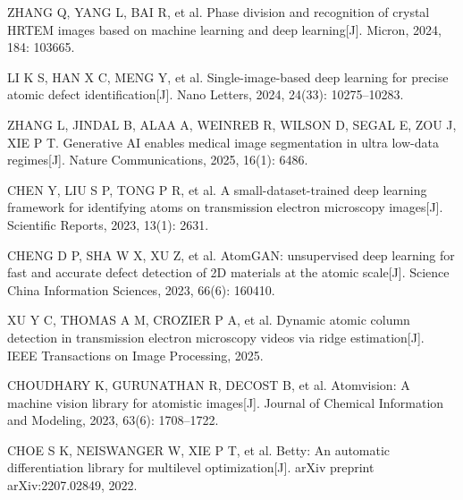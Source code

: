ZHANG Q, YANG L, BAI R, et al. Phase division and recognition of crystal HRTEM images based on machine learning and deep learning[J]. Micron, 2024, 184: 103665.

LI K S, HAN X C, MENG Y, et al. Single-image-based deep learning for precise atomic defect identification[J]. Nano Letters, 2024, 24(33): 10275--10283.

ZHANG L, JINDAL B, ALAA A, WEINREB R, WILSON D, SEGAL E, ZOU J, XIE P T. Generative AI enables medical image segmentation in ultra low-data regimes[J]. Nature Communications, 2025, 16(1): 6486.

CHEN Y, LIU S P, TONG P R, et al. A small-dataset-trained deep learning framework for identifying atoms on transmission electron microscopy images[J]. Scientific Reports, 2023, 13(1): 2631.

CHENG D P, SHA W X, XU Z, et al. AtomGAN: unsupervised deep learning for fast and accurate defect detection of 2D materials at the atomic scale[J]. Science China Information Sciences, 2023, 66(6): 160410.

XU Y C, THOMAS A M, CROZIER P A, et al. Dynamic atomic column detection in transmission electron microscopy videos via ridge estimation[J]. IEEE Transactions on Image Processing, 2025.

CHOUDHARY K, GURUNATHAN R, DECOST B, et al. Atomvision: A machine vision library for atomistic images[J]. Journal of Chemical Information and Modeling, 2023, 63(6): 1708--1722.

CHOE S K, NEISWANGER W, XIE P T, et al. Betty: An automatic differentiation library for multilevel optimization[J]. arXiv preprint arXiv:2207.02849, 2022.
